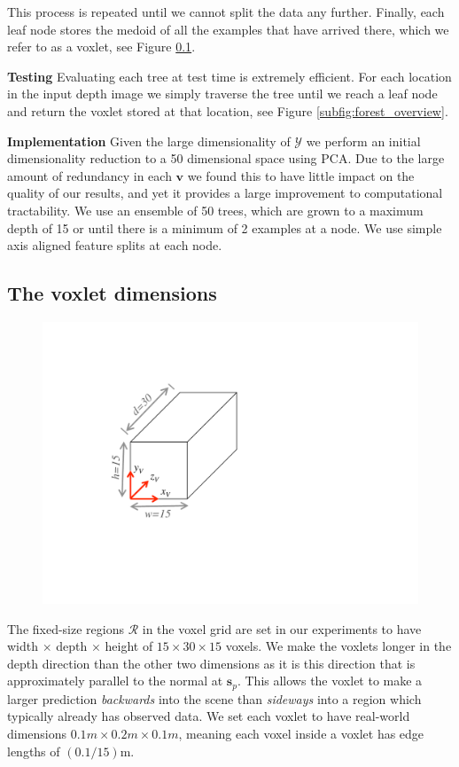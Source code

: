\documentclass[10pt,twocolumn,letterpaper]{article}
\newcommand{\pixelidx}{\mathbf{s}}
\newcommand{\note}[1]{\textcolor{blue}{NOTE: #1}}
\renewcommand{\paragraph}{\vspace{2pt}\noindent\textbf}
\begin{document}
This process is repeated until we cannot split the data any further. 
Finally, each leaf node stores the medoid of all the examples that have arrived there, which we refer to as a voxlet, see Figure \ref{}.


\paragraph{Testing} 
Evaluating each tree at test time is extremely efficient. 
For each location in the input depth image we simply traverse the tree until we reach a leaf node and return the voxlet stored at that location, see Figure \ref{subfig:forest_overview}. 

\paragraph{Implementation} 
Given the large dimensionality of $\mathcal{Y}$ we perform an initial dimensionality reduction to a 50 dimensional space using PCA.
Due to the large amount of redundancy in each $\mathbf{v}$ we found this to have little impact on the quality of our results, and yet it provides a large improvement to computational tractability.
We use an ensemble of 50 trees, which are grown to a maximum depth of 15 or until there is a minimum of 2 examples at a node. 
We use simple axis aligned feature splits at each node.



\subsection{The voxlet dimensions}
\begin{figure}
  \vspace{-20pt}
  \centering
    \includegraphics[width=0.35\columnwidth, clip=true, trim=120 140 340 80]{single_voxlet}
    \vspace{-15pt}
  \caption{}%
    \label{fig:voxlet_dims}
\end{figure}
The fixed-size regions $\mathcal{R}$ in the voxel grid are set in our experiments to have width $\times$ depth $\times$ height of $15 \times 30 \times 15$ voxels.
We make the voxlets longer in the depth direction than the other two dimensions as it is this direction that is approximately parallel to the normal at $\pixelidx_p$.
This allows the voxlet to make a larger prediction \emph{backwards} into the scene than \emph{sideways} into a region which typically already has observed data.
We set each voxlet to have real-world dimensions $0.1m \times 0.2m \times 0.1m$, meaning each voxel inside a voxlet has edge lengths of $(0.1 / 15)$m.
\end{document}
